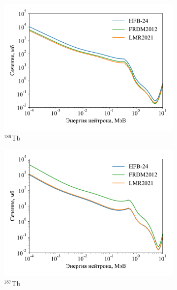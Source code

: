 \begin{figure}
\begin{subfigure}{0.48\textwidth}
    \includegraphics[width=\textwidth]{../pics/cs_tb186.pdf}
    \caption{${}^{186}$Tb}
  \end{subfigure}
  \hfil
  \begin{subfigure}{0.48\textwidth}
    \centering
    \includegraphics[width=\textwidth]{../pics/cs_tb187.pdf}
    \caption{${}^{187}$Tb}
  \end{subfigure}
  \\
  \begin{subfigure}{0.48\textwidth}
    \centering

\end{subfigure}
\end{figure}
